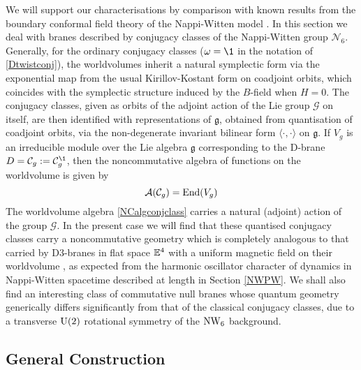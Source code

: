 We will support our characterisations by comparison with known results from the
boundary conformal field theory of the Nappi-Witten model \cite{DK2,Hikida1}. In
this section we deal with branes described by conjugacy classes of the
Nappi-Witten group $\mathcal{N}_6$. Generally, for the ordinary conjugacy
classes ($\omega=\1$ in the notation of \eqref{Dtwistconj}), the worldvolumes
inherit a natural symplectic form via the exponential map from the usual
Kirillov-Kostant form on coadjoint orbits, which coincides with the symplectic
structure induced by the $B$-field when $H=0$. The conjugacy classes, given as
orbits of the adjoint action of the Lie group $\mathcal{G}$ on itself, are then
identified with representations of $\mathfrak{g}$, obtained from quantisation of
coadjoint orbits, via the non-degenerate invariant bilinear form
$\langle\cdot,\cdot\rangle$ on $\mathfrak{g}$. If $V_g$ is an irreducible module
over the Lie algebra $\mathfrak{g}$ corresponding to the D-brane
$D=\mathcal{C}_g:=\mathcal{C}_g^{\1}$, then the noncommutative algebra of
functions on the worldvolume is given by \cite{ARS1}
\begin{equation}
  \label{NCalgconjclass}
  \mathcal{A}(\mathcal{C}_g)={\rm End}(V_g)
\end{equation}
The worldvolume algebra \eqref{NCalgconjclass} carries a natural (adjoint)
action of the group $\mathcal{G}$. In the present case we will find that these
quantised conjugacy classes carry a noncommutative geometry which is completely
analogous to that carried by D3-branes in flat space ${\mathbb E}^4$ with a uniform
magnetic field on their worldvolume \cite{DNek1,SW1,Sz1,Sz2}, as expected from
the harmonic oscillator character of dynamics in Nappi-Witten spacetime
described at length in Section \ref{NWPW}. We shall also find an interesting
class of commutative null branes whose quantum geometry generically differs
significantly from that of the classical conjugacy classes, due to a transverse
${\rm U}(2)$ rotational symmetry of the $\operatorname{NW}_6$ background.

\subsection{General Construction}
\label{GenConstrUntwist}

